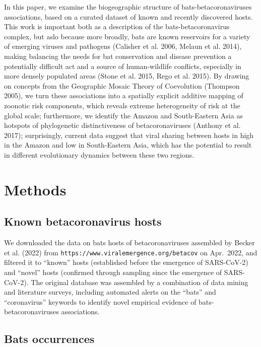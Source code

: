 \documentclass[10pt,oneside]{article}
\begin{document}
In this paper, we examine the biogeographic structure of
bats-betacoronaviruses associations, based on a curated dataset of known
and recently discovered hosts. This work is important both as a
description of the bats-betacoronavirus complex, but aslo because more
broadly, bats are known reservoirs for a variety of emerging viruses and
pathogens (Calisher et al. 2006, Melaun et al. 2014), making balancing
the needs for bat conservation and disease prevention a potentially
difficult act and a source of human-wildlife conflicts, especially in
more densely populated areas (Stone et al. 2015, Rego et al. 2015). By
drawing on concepts from the Geographic Mosaic Theory of Coevolution
(Thompson 2005), we turn these associations into a spatially explicit
additive mapping of zoonotic risk components, which reveals extreme
heterogeneity of risk at the global scale; furthermore, we identify the
Amazon and South-Eastern Asia as hotspots of phylogenetic
distinctiveness of betacoronaviruses (Anthony et al. 2017);
surprisingly, current data suggest that viral sharing between hosts in
high in the Amazon and low in South-Eastern Asia, which has the
potential to result in different evolutionary dynamics between these two
regions.

\hypertarget{methods}{%
\section{Methods}\label{methods}}

\hypertarget{known-betacoronavirus-hosts}{%
\subsection{Known betacoronavirus
hosts}\label{known-betacoronavirus-hosts}}

We downloaded the data on bats hosts of betacoronaviruses assembled by
Becker et al. (2022) from
\texttt{https://www.viralemergence.org/betacov} on Apr.~2022, and
filtered it to ``known'' hosts (established before the emergence of
SARS-CoV-2) and ``novel'' hosts (confirmed through sampling since the
emergence of SARS-CoV-2). The original database was assembled by a
combination of data mining and literature surveys, including automated
alerts on the ``bats'' and ``coronavirus'' keywords to identify novel
empirical evidence of bats-betacoronaviruses associations.

\hypertarget{bats-occurrences}{%
\subsection{Bats occurrences}\label{bats-occurrences}}
\end{document}
